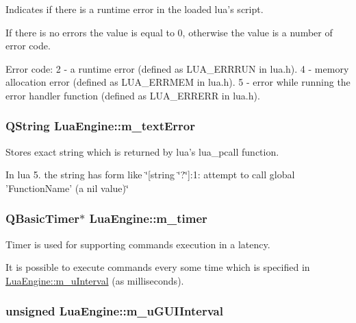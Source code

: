 Indicates if there is a runtime error in the loaded lua's script. 

If there is no errors the value is equal to 0, otherwise the value is a number of error code. \begin{DoxyVerb}            Error code:
            2 - a runtime error (defined as LUA_ERRRUN in lua.h).
            4 - memory allocation error (defined as LUA_ERRMEM in lua.h).
            5 - error while running the error handler function (defined as LUA_ERRERR in lua.h).\end{DoxyVerb}
 \hypertarget{class_lua_engine_a0cb5dc043a3f9b162ad97245cd7e6956}{
\subsubsection[{m\-\_\-text\-Error}]{\setlength{\rightskip}{0pt plus 5cm}Q\-String Lua\-Engine\-::m\-\_\-text\-Error\hspace{0.3cm}{\ttfamily [private]}}}\label{class_lua_engine_a0cb5dc043a3f9b162ad97245cd7e6956}


Stores exact string which is returned by lua's lua\-\_\-pcall function. 

In lua 5. the string has form like \char`\"{}\mbox{[}string \char`\"{}?\char`\"{}\mbox{]}\-:1\-: attempt to call global '\-Function\-Name' (a nil value)\char`\"{} \hypertarget{class_lua_engine_a367284a1461c5a2d2804c3f9b4d94f14}{
\subsubsection[{m\-\_\-timer}]{\setlength{\rightskip}{0pt plus 5cm}Q\-Basic\-Timer$\ast$ Lua\-Engine\-::m\-\_\-timer\hspace{0.3cm}{\ttfamily [private]}}}\label{class_lua_engine_a367284a1461c5a2d2804c3f9b4d94f14}


Timer is used for supporting commands execution in a latency. 

It is possible to execute commands every some time which is specified in \hyperlink{class_lua_engine_af25b4a96c17c157ae110afa1dd0866ec}{Lua\-Engine\-::m\-\_\-u\-Interval} (as milliseconds). \hypertarget{class_lua_engine_ac7d00771a353cc9afa586a6ec10f5d90}{
\subsubsection[{m\-\_\-u\-G\-U\-I\-Interval}]{\setlength{\rightskip}{0pt plus 5cm}unsigned Lua\-Engine\-::m\-\_\-u\-G\-U\-I\-Interval\hspace{0.3cm}{\ttfamily [private]}}}\label{class_lua_engine_ac7d00771a353cc9afa586a6ec10f5d90}


